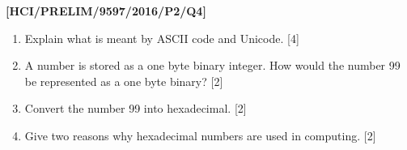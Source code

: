 \item \textbf{{[}HCI/PRELIM/9597/2016/P2/Q4{]} }
\begin{enumerate}
\item Explain what is meant by ASCII code and Unicode.\hfill{} {[}4{]}
\item A number is stored as a one byte binary integer. How would the number
99 be represented as a one byte binary? \hfill{}{[}2{]}
\item Convert the number 99 into hexadecimal. \hfill{}{[}2{]}
\item Give two reasons why hexadecimal numbers are used in computing. \hfill{}{[}2{]}
\end{enumerate}